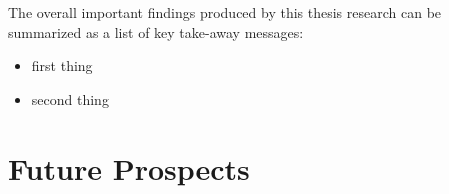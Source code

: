 The overall important findings produced by this thesis research can be summarized as a list of key take-away messages:
\begin{itemize}
\item first thing
\item second thing
\end{itemize}

\section{Future Prospects}
\label{sec:future}


\endinput
Any text after an \endinput is ignored.
You could put scraps here or things in progress.
